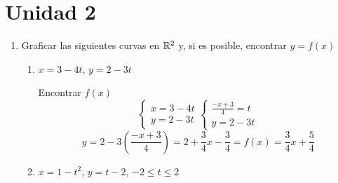 \documentclass[../practica.root.tex]{subfiles}
\begin{document}
\section{Unidad 2}
\begin{enumerate}
    \item Graficar las siguientes curvas en $\mathbb{R}^2$ y, si es posible, encontrar $y = f(x)$
          \begin{enumerate}
              \item $x = 3 - 4t$, $y = 2 - 3t$

                    Encontrar $f(x)$
                    \[
                        \begin{cases}
                            x = 3 - 4t \\
                            y = 2 - 3t
                        \end{cases}
                        \begin{cases}
                            \frac{-x + 3}{4} = t \\
                            y = 2 - 3t
                        \end{cases}
                    \] \[
                        y = 2 - 3\left(\frac{-x +3}{4}\right) = 2 + \frac{3}{4}x - \frac{3}{4} = \boxed{f(x) = \frac{3}{4}x + \frac{5}{4}}
                    \]

              \item $x = 1 - t^2$, $y = t - 2$, $-2 \leq t \leq 2$


\end{enumerate}
\end{enumerate}
\end{document}
